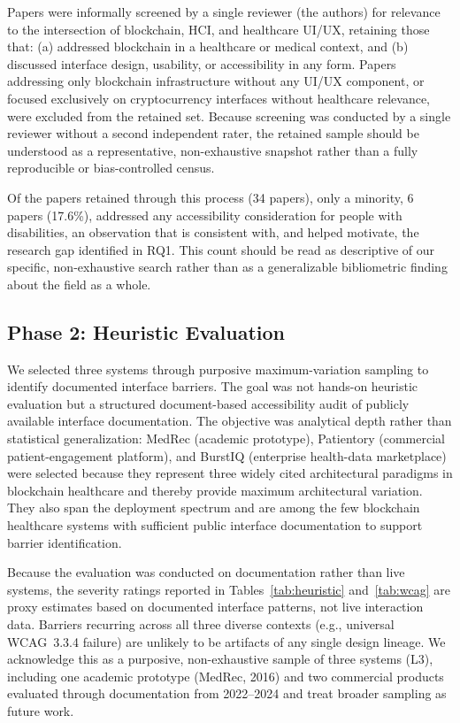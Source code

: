 \documentclass[journal,onecolumn]{IEEEtran}
\begin{document}
Papers were informally screened by a single reviewer (the authors) for relevance to the intersection of blockchain, HCI, and healthcare UI/UX, retaining those that: (a) addressed blockchain in a healthcare or medical context, and (b) discussed interface design, usability, or accessibility in any form. Papers addressing only blockchain infrastructure without any UI/UX component, or focused exclusively on cryptocurrency interfaces without healthcare relevance, were excluded from the retained set. Because screening was conducted by a single reviewer without a second independent rater, the retained sample should be understood as a representative, non-exhaustive snapshot rather than a fully reproducible or bias-controlled census.

Of the papers retained through this process (34 papers), only a minority, 6 papers (17.6\%), addressed any accessibility consideration for people with disabilities, an observation that is consistent with, and helped motivate, the research gap identified in RQ1. This count should be read as descriptive of our specific, non-exhaustive search rather than as a generalizable bibliometric finding about the field as a whole.

\subsection{Phase 2: Heuristic Evaluation}
\label{subsec:heuristic-eval}
We selected three systems through purposive maximum-variation sampling to identify documented interface barriers. The goal was not hands-on heuristic evaluation but a structured document-based accessibility audit of publicly available interface documentation. The objective was analytical depth rather than statistical generalization: MedRec (academic prototype), Patientory (commercial patient-engagement platform), and BurstIQ (enterprise health-data marketplace) were selected because they represent three widely cited architectural paradigms in blockchain healthcare and thereby provide maximum architectural variation. They also span the deployment spectrum and are among the few blockchain healthcare systems with sufficient public interface documentation to support barrier identification.

Because the evaluation was conducted on documentation rather than live systems, the severity ratings reported in Tables~\ref{tab:heuristic} and~\ref{tab:wcag} are proxy estimates based on documented interface patterns, not live interaction data. Barriers recurring across all three diverse contexts (e.g., universal WCAG~3.3.4 failure) are unlikely to be artifacts of any single design lineage. We acknowledge this as a purposive, non-exhaustive sample of three systems (L3), including one academic prototype (MedRec, 2016) and two commercial products evaluated through documentation from 2022--2024 and treat broader sampling as future work.
\end{document}
